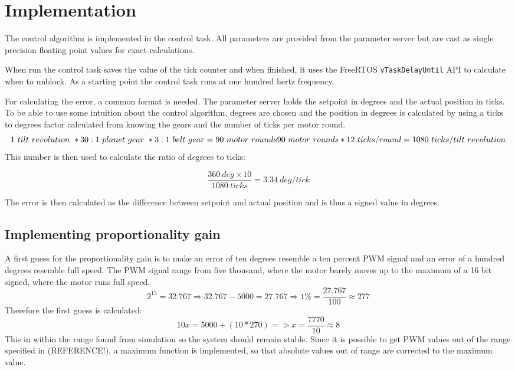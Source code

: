 \section{Implementation}
The control algorithm is implemented in the control task. All parameters are provided from the parameter server but are cast as single precision floating point values for exact calculations.

When run the control task saves the value of the tick counter and when finished, it uses the FreeRTOS \texttt{vTaskDelayUntil} API to calculate when to unblock. As a starting point the control task runs at one hundred hertz frequency.

For calculating the error, a common format is needed. The parameter server holds the setpoint in degrees and the actual position in ticks. To be able to use some intuition about the control algorithm, degrees are chosen and the position in degrees is calculated by using a ticks to degrees factor calculated from knowing the gears and the number of ticks per motor round.
\begin{equation}
1 \ tilt \ revolution \ * 30:1 \ planet \ gear \ * 3:1 \ belt \ gear = 90 \ motor \ rounds \\ 90 \ motor \ rounds * 12 \ ticks/round = 1080 \ ticks/tilt \ revolution 
\end{equation}
This number is then used to calculate the ratio of degrees to ticks:

\begin{equation}
\frac{360 \ deg \times 10}{1080 \ ticks} = 3.34\ deg/tick 
\end{equation}

The error is then calculated as the difference between setpoint and actual position and is thus a signed value in degrees.

\subsection{Implementing proportionality gain}
A first guess for the proportionality gain is to make an error of ten degrees resemble a ten percent PWM signal and an error of a hundred degrees resemble full speed. The PWM signal range from five thousand, where the motor barely moves up to the maximum of a 16 bit signed, where the motor runs full speed.
\begin{equation}
2^{15} = 32.767 \Rightarrow 
32.767 - 5000 = 27.767 \Rightarrow 
1 \% = \frac{27.767}{100} \approx  277
	\label{eq:PWM}
\end{equation}
 Therefore the first guess is calculated:
\begin{equation}
10x = 5000 + (10 * 270) => x = \frac{7770}{10} \approx  8
	\label{eq:P-term}
\end{equation}
This in within the range found from simulation so the system should remain stable. Since it is possible to get PWM values out of the range specified in (REFERENCE!), a maximum function is implemented, so that absolute values out of range are corrected to the maximum value.

